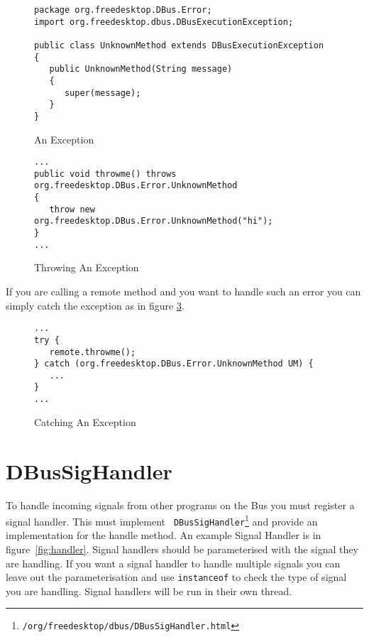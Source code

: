 \documentclass[a4paper,12pt]{article}
\begin{document}
\begin{figure}[htb]
\begin{center}
\begin{verbatim}
package org.freedesktop.DBus.Error;
import org.freedesktop.dbus.DBusExecutionException;

public class UnknownMethod extends DBusExecutionException
{
   public UnknownMethod(String message)
   {
      super(message);
   }
}
\end{verbatim}
\end{center}
\caption{An Exception}
\label{fig:exceptiondef}
\end{figure}

\begin{figure}[htb]
\begin{center}
\begin{verbatim}
...
public void throwme() throws org.freedesktop.DBus.Error.UnknownMethod
{
   throw new org.freedesktop.DBus.Error.UnknownMethod("hi");
}
...
\end{verbatim}
\end{center}
\caption{Throwing An Exception}
\label{fig:exceptioncall}
\end{figure}

If you are calling a remote method and you want to handle such an error you can
simply catch the exception as in figure \ref{fig:exceptioncatch}. 

\begin{figure}[htb]
\begin{center}
\begin{verbatim}
...
try {
   remote.throwme();
} catch (org.freedesktop.DBus.Error.UnknownMethod UM) {
   ...
}
...
\end{verbatim}
\end{center}
\caption{Catching An Exception}
\label{fig:exceptioncatch}
\end{figure}

\section{DBusSigHandler}

To handle incoming signals from other programs on the Bus you must register a
signal handler. This must implement {\tt
DBusSigHandler\footnote{\javadocroot/org/freedesktop/dbus/DBusSigHandler.html}}
and provide an implementation for the handle method. An example Signal Handler
is in figure~\ref{fig:handler}. Signal handlers should be parameterised with
the signal they are handling. If you want a signal handler to handle multiple
signals you can leave out the parameterisation and use {\tt instanceof} to
check the type of signal you are handling. Signal handlers will be run in their
own thread.
\end{document}

